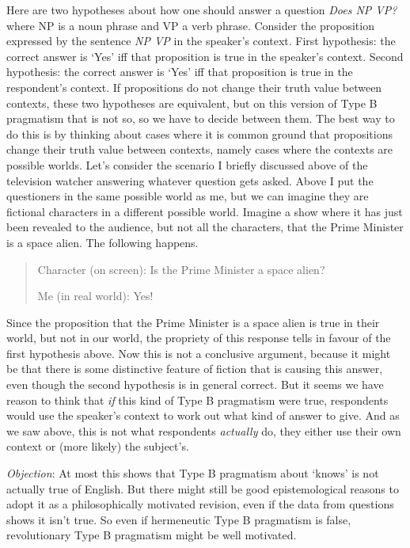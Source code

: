 \documentclass[
  11pt,
  letterpaper,
  DIV=11,
  numbers=noendperiod,
  twoside]{scrartcl}
\begin{document}
Here are two hypotheses about how one should answer a question
\emph{Does NP VP?} where NP is a noun phrase and VP a verb phrase.
Consider the proposition expressed by the sentence \emph{NP VP} in the
speaker's context. First hypothesis: the correct answer is `Yes' iff
that proposition is true in the speaker's context. Second hypothesis:
the correct answer is `Yes' iff that proposition is true in the
respondent's context. If propositions do not change their truth value
between contexts, these two hypotheses are equivalent, but on this
version of Type B pragmatism that is not so, so we have to decide
between them. The best way to do this is by thinking about cases where
it is common ground that propositions change their truth value between
contexts, namely cases where the contexts are possible worlds. Let's
consider the scenario I briefly discussed above of the television
watcher answering whatever question gets asked. Above I put the
questioners in the same possible world as me, but we can imagine they
are fictional characters in a different possible world. Imagine a show
where it has just been revealed to the audience, but not all the
characters, that the Prime Minister is a space alien. The following
happens.

\begin{quote}
Character (on screen): Is the Prime Minister a space alien?

Me (in real world): Yes!
\end{quote}

Since the proposition that the Prime Minister is a space alien is true
in their world, but not in our world, the propriety of this response
tells in favour of the first hypothesis above. Now this is not a
conclusive argument, because it might be that there is some distinctive
feature of fiction that is causing this answer, even though the second
hypothesis is in general correct. But it seems we have reason to think
that \emph{if} this kind of Type B pragmatism were true, respondents
would use the speaker's context to work out what kind of answer to give.
And as we saw above, this is not what respondents \emph{actually} do,
they either use their own context or (more likely) the subject's.

\emph{Objection}: At most this shows that Type B pragmatism about
`knows' is not actually true of English. But there might still be good
epistemological reasons to adopt it as a philosophically motivated
revision, even if the data from questions shows it isn't true. So even
if hermeneutic Type B pragmatism is false, revolutionary Type B
pragmatism might be well motivated.
\end{document}
